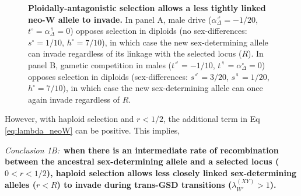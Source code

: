 \documentclass[10pt,letterpaper]{article}
\begin{document}
\begin{figure}[!h]
\centering
\caption{
{\bf Ploidally-antagonistic selection allows a less tightly linked neo-W allele to invade.}
In panel A, male drive ($\alpha^\male_{\Delta} = -1/20$, $t^\circ = \alpha^\female_{\Delta} = 0$) opposes selection in diploids (no sex-differences: $s^\circ = 1/10$, $h^\circ = 7/10$), in which case the new sex-determining allele can invade regardless of its linkage with the selected locus ($R$).   
In panel B, gametic competition in males ($t^\male = -1/10$, $t^\female = \alpha^\circ_{\Delta} = 0$) opposes selection in diploids (sex-differences: $s^\male = 3/20$, $s^\female = 1/20$, $h^\circ = 7/10$), in which case the new sex-determining allele can once again invade regardless of $R$.
}
\label{fig:Combination_Centimorgans}
\end{figure}

However, with haploid selection and $r<1/2$, the additional term in Eq \eqref{eq:lambda_neoW} can be positive.
This implies, 
\vspace{0.5cm}

\noindent\textit{Conclusion 1B:}\
\textbf{when there is an intermediate rate of recombination between the ancestral sex-determining allele and a selected locus ($0<r<1/2$), haploid selection allows less closely linked sex-determining alleles ($r<R$) to invade during trans-GSD transitions ($\lambda_{W'}^{(XY)}>1$).}
\vspace{0.5cm}
\end{document}
